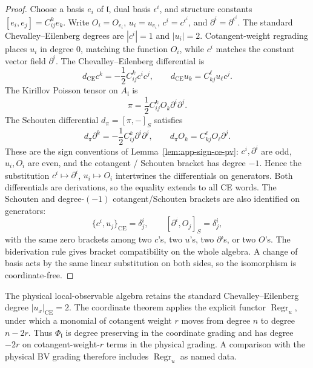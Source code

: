 \documentclass[11pt]{memoir}
\begin{document}
\begin{proof}
  Choose a basis \(e_i\) of \(\mathfrak l\), dual basis \(\epsilon^i\), and
  structure constants \([e_i,e_j]=C^k_{ij}e_k\). Write \(O_i=O_{e_i}\),
  \(u_i=u_{e_i}\), \(c^i=c^{\epsilon^i}\), and
  \(\partial^i=\partial^{\epsilon^i}\).  The standard
  Chevalley--Eilenberg degrees are \(|c^i|=1\) and \(|u_i|=2\).
  Cotangent-weight regrading places \(u_i\) in degree \(0\), matching
  the function \(O_i\), while \(c^i\) matches the constant vector field
  \(\partial^i\).  The Chevalley--Eilenberg differential is
  \[
    d_{\mathrm{CE}}c^k=-\frac12 C^k_{ij}c^ic^j,\qquad
    d_{\mathrm{CE}}u_k=C^\ell_{kj}u_\ell c^j.
  \]
  The Kirillov Poisson tensor on \(A_{\mathfrak l}\) is
  \[
    \pi=\frac12 C^k_{ij}O_k\partial^i\partial^j.
  \]
  The Schouten differential \(d_\pi=[\pi,-]_S\) satisfies
  \[
    d_\pi\partial^k=-\frac12 C^k_{ij}\partial^i\partial^j,\qquad
    d_\pi O_k=C^\ell_{kj}O_\ell\partial^j.
  \]
  These are the sign conventions of
  Lemma~\ref{lem:app-sign-ce-pv}: \(c^i,\partial^i\) are odd,
  \(u_i,O_i\) are even, and the cotangent / Schouten bracket has
  degree \(-1\).
  Hence the substitution \(c^i\mapsto\partial^i\), \(u_i\mapsto O_i\)
  intertwines the differentials on generators. Both differentials are
  derivations, so the equality extends to all CE words. The Schouten and
  degree-\((-1)\) cotangent/Schouten brackets are also identified on
  generators:
  \[
    \{c^i,u_j\}_{\mathrm{CE}}=\delta^i_j,\qquad
    [\partial^i,O_j]_S=\delta^i_j,
  \]
  with the same zero brackets among two \(c\)'s, two \(u\)'s, two
  \(\partial\)'s, or two \(O\)'s. The biderivation rule gives bracket
  compatibility on the whole algebra. A change of basis acts by the same
  linear substitution on both sides, so the isomorphism is coordinate-free.
\end{proof}

\begin{rmk}
\label{rmk:u-degree-regrading}
  The physical local-observable algebra retains the standard
  Chevalley--Eilenberg degree \(|u_x|_{\mathrm{CE}}=2\).  The coordinate
  theorem applies the explicit functor \(\operatorname{Regr}_u\), under
  which a monomial of cotangent weight \(r\) moves from degree \(n\) to
  degree \(n-2r\).  Thus \(\Phi_{\mathfrak l}\) is degree preserving in
  the coordinate grading and has degree \(-2r\) on cotangent-weight-\(r\)
  terms in the physical grading.  A comparison with the physical BV
  grading therefore includes \(\operatorname{Regr}_u\) as named data.
\end{rmk}
\end{document}
